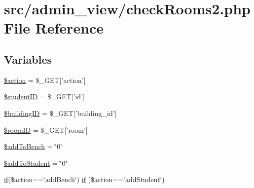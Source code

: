 \hypertarget{checkRooms2_8php}{\section{src/admin\-\_\-view/check\-Rooms2.php \-File \-Reference}
\label{checkRooms2_8php}
}
\subsection*{\-Variables}
\begin{DoxyCompactItemize}
\item 
\hyperlink{checkRooms2_8php_aa698a3e72116e8e778be0e95d908ee30}{\$action} = \$\-\_\-\-G\-E\-T\mbox{[}'action'\mbox{]}
\item 
\hyperlink{checkRooms2_8php_af62eac6f1a6ea66c9f90093940147945}{\$student\-I\-D} = \$\-\_\-\-G\-E\-T\mbox{[}'id'\mbox{]}
\item 
\hyperlink{checkRooms2_8php_acfaa0ff73c631ce07c4851ed12fcd83d}{\$building\-I\-D} = \$\-\_\-\-G\-E\-T\mbox{[}'building\-\_\-id'\mbox{]}
\item 
\hyperlink{checkRooms2_8php_a61034568ba6e795a925d00afa98d3797}{\$room\-I\-D} = \$\-\_\-\-G\-E\-T\mbox{[}'room'\mbox{]}
\item 
\hyperlink{checkRooms2_8php_a203f48bd509ef90819599e761f574023}{\$add\-To\-Bench} = \char`\"{}0\char`\"{}
\item 
\hyperlink{checkRooms2_8php_ab8b532875ded9bdf4075f627ddf2fa78}{\$add\-To\-Student} = \char`\"{}0\char`\"{}
\item 
\hyperlink{updateBenchDB_8php_a0c1f2915e12defa9f4d515347d884dee}{if}(\$action==\char`\"{}add\-Bench\char`\"{}) \hyperlink{checkRooms2_8php_a8e6545ce0238da2ec377455ff693414e}{if} (\$action==\char`\"{}add\-Student\char`\"{})
\end{DoxyCompactItemize}


